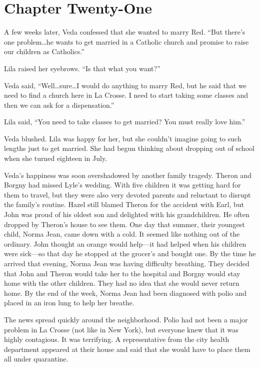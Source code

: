 \documentclass[
  letterpaper,
]{book}
\begin{document}

\chapter{Chapter Twenty-One}\label{chapter-twenty-one}

A few weeks later, Veda confessed that she wanted to marry Red. ``But
there's one problem\ldots he wants to get married in a Catholic church
and promise to raise our children as Catholics.''

Lila raised her eyebrows. ``Is that what you want?''

Veda said, ``Well\ldots sure\ldots I would do anything to marry Red, but
he said that we need to find a church here in La Crosse. I need to start
taking some classes and then we can ask for a dispensation.''

Lila said, ``You need to take classes to get married? You must really
love him.''

Veda blushed. Lila was happy for her, but she couldn't imagine going to
such lengths just to get married. She had begun thinking about dropping
out of school when she turned eighteen in July.

Veda's happiness was soon overshadowed by another family tragedy. Theron
and Borgny had missed Lyle's wedding. With five children it was getting
hard for them to travel, but they were also very devoted parents and
reluctant to disrupt the family's routine. Hazel still blamed Theron for
the accident with Earl, but John was proud of his oldest son and
delighted with his grandchildren. He often dropped by Theron's house to
see them. One day that summer, their youngest child, Norma Jean, came
down with a cold. It seemed like nothing out of the ordinary. John
thought an orange would help---it had helped when his children were
sick---so that day he stopped at the grocer's and bought one. By the
time he arrived that evening, Norma Jean was having difficulty
breathing. They decided that John and Theron would take her to the
hospital and Borgny would stay home with the other children. They had no
idea that she would never return home. By the end of the week, Norma
Jean had been diagnosed with polio and placed in an iron lung to help
her breathe.

The news spread quickly around the neighborhood. Polio had not been a
major problem in La Crosse (not like in New York), but everyone knew
that it was highly contagious. It was terrifying. A representative from
the city health department appeared at their house and said that she
would have to place them all under quarantine.
\end{document}
